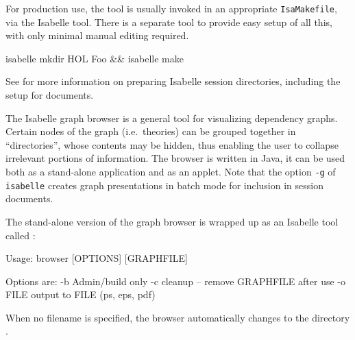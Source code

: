 \begin{isabellebody}
\begin{isamarkuptext}
  \medskip For production use, the \hyperlink{tool.usedir}{\mbox{}} tool is usually
  invoked in an appropriate \verb|IsaMakefile|, via the Isabelle
  \hyperlink{tool.make}{\mbox{}} tool.  There is a separate \hyperlink{tool.mkdir}{\mbox{}} tool to
  provide easy setup of all this, with only minimal manual editing
  required.
\begin{ttbox}
isabelle mkdir HOL Foo && isabelle make
\end{ttbox}
  See  for more information on preparing
  Isabelle session directories, including the setup for documents.%
\end{isamarkuptext}%
\isamarkuptrue%
%
\isamarkuptrue%
%
\begin{isamarkuptext}%

  The Isabelle graph browser is a general tool for visualizing
  dependency graphs.  Certain nodes of the graph (i.e.~theories) can
  be grouped together in ``directories'', whose contents may be
  hidden, thus enabling the user to collapse irrelevant portions of
  information.  The browser is written in Java, it can be used both as
  a stand-alone application and as an applet.  Note that the option
  \verb|-g| of \verb|isabelle| \hyperlink{tool.usedir}{\mbox{}} creates
  graph presentations in batch mode for inclusion in session
  documents.%
\end{isamarkuptext}%
\isamarkuptrue%
%
\isamarkuptrue%
%
\begin{isamarkuptext}%
The stand-alone version of the graph browser is wrapped up as an
  Isabelle tool called \hypertarget{tool.browser}{\hyperlink{tool.browser}{\mbox{}}}:

\begin{ttbox}
Usage: browser [OPTIONS] [GRAPHFILE]

  Options are:
    -b           Admin/build only
    -c           cleanup -- remove GRAPHFILE after use
    -o FILE      output to FILE (ps, eps, pdf)
\end{ttbox}
  When no filename is specified, the browser automatically changes to
  the directory \hyperlink{setting.ISABELLE-BROWSER-INFO}{\mbox{}}.


\end{isamarkuptext}
\end{isabellebody}
